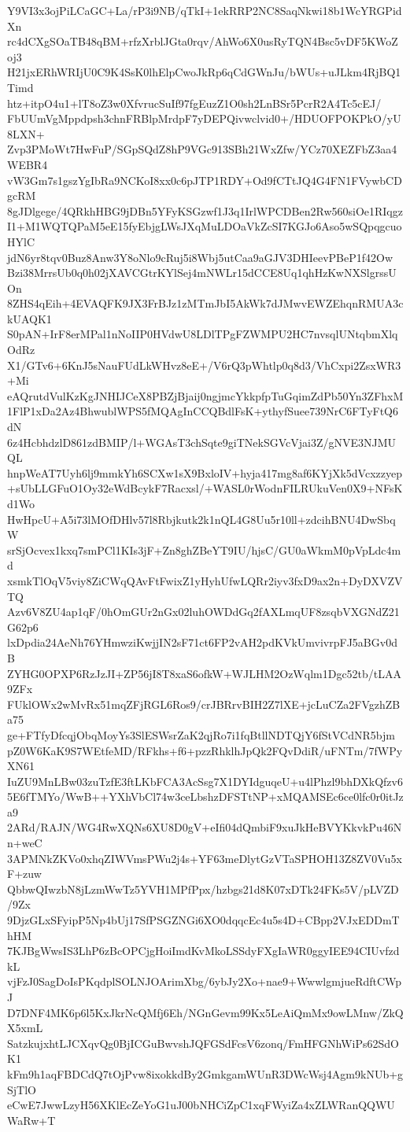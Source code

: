Y9VI3x3ojPiLCaGC+La/rP3i9NB/qTkI+1ekRRP2NC8SaqNkwi18b1WcYRGPidXn
rc4dCXgSOaTB48qBM+rfzXrblJGta0rqv/AhWo6X0usRyTQN4Bsc5vDF5KWoZoj3
H21jxERhWRIjU0C9K4SsK0lhElpCwoJkRp6qCdGWnJu/bWUs+uJLkm4RjBQ1Timd
htz+itpO4u1+lT8oZ3w0XfvrucSuIf97fgEuzZ1O0sh2LnBSr5PcrR2A4Tc5cEJ/
FbUUmVgMppdpsh3chnFRBlpMrdpF7yDEPQivwclvid0+/HDUOFPOKPkO/yU8LXN+
Zvp3PMoWt7HwFuP/SGpSQdZ8hP9VGc913SBh21WxZfw/YCz70XEZFbZ3aa4WEBR4
vW3Gm7s1gszYgIbRa9NCKoI8xx0c6pJTP1RDY+Od9fCTtJQ4G4FN1FVywbCDgcRM
8gJDlgege/4QRkhHBG9jDBn5YFyKSGzwf1J3q1IrlWPCDBen2Rw560siOe1RIqgz
I1+M1WQTQPaM5eE15fyEbjgLWsJXqMuLDOaVkZcSI7KGJo6Aso5wSQpqgcuoHYlC
jdN6yr8tqv0Buz8Anw3Y8oNlo9cRuj5i8Wbj5utCaa9aGJV3DHIeevPBeP1f42Ow
Bzi38MrrsUb0q0h02jXAVCGtrKYlSej4mNWLr15dCCE8Uq1qhHzKwNXSlgrssUOn
8ZHS4qEih+4EVAQFK9JX3FrBJz1zMTmJbI5AkWk7dJMwvEWZEhqnRMUA3ckUAQK1
S0pAN+IrF8erMPal1nNoIIP0HVdwU8LDlTPgFZWMPU2HC7nvsqlUNtqbmXlqOdRz
X1/GTv6+6KnJ5sNauFUdLkWHvz8eE+/V6rQ3pWhtlp0q8d3/VhCxpi2ZsxWR3+Mi
eAQrutdVulKzKgJNHIJCeX8PBZjBjaij0ngjmcYkkpfpTuGqimZdPb50Yn3ZFhxM
1FlP1xDa2Az4BhwublWPS5fMQAgInCCQBdlFsK+ythyfSuee739NrC6FTyFtQ6dN
6z4HcbhdzlD861zdBMIP/l+WGAsT3chSqte9giTNekSGVcVjai3Z/gNVE3NJMUQL
hnpWeAT7Uyh6lj9mmkYh6SCXw1sX9BxloIV+hyja417mg8af6KYjXk5dVcxzzyep
+sUbLLGFuO1Oy32eWdBcykF7Racxsl/+WASL0rWodnFILRUkuVen0X9+NFsKd1Wo
HwHpcU+A5i73lMOfDHlv57l8Rbjkutk2k1nQL4G8Uu5r10ll+zdcihBNU4DwSbqW
srSjOcvex1kxq7smPCl1KIs3jF+Zn8ghZBeYT9IU/hjsC/GU0aWkmM0pVpLdc4md
xsmkTlOqV5viy8ZiCWqQAvFtFwixZ1yHyhUfwLQRr2iyv3fxD9ax2n+DyDXVZVTQ
Azv6V8ZU4ap1qF/0hOmGUr2nGx02luhOWDdGq2fAXLmqUF8zsqbVXGNdZ21G62p6
lxDpdia24AeNh76YHmwziKwjjIN2sF71ct6FP2vAH2pdKVkUmvivrpFJ5aBGv0dB
ZYHG0OPXP6RzJzJI+ZP56jI8T8xaS6ofkW+WJLHM2OzWqlm1Dgc52tb/tLAA9ZFx
FUklOWx2wMvRx51mqZFjRGL6Ros9/crJBRrvBIH2Z7lXE+jcLuCZa2FVgzhZBa75
ge+FTfyDfcqjObqMoyYs3SlESWsrZaK2qjRo7i1fqBtllNDTQjY6fStVCdNR5bjm
pZ0W6KaK9S7WEtfeMD/RFkhs+f6+pzzRhklhJpQk2FQvDdiR/uFNTm/7fWPyXN61
IuZU9MnLBw03zuTzfE3ftLKbFCA3AcSsg7X1DYIdguqeU+u4lPhzl9bhDXkQfzv6
5E6fTMYo/WwB++YXhVbCl74w3ceLbshzDFSTtNP+xMQAMSEc6ce0lfc0r0itJza9
2ARd/RAJN/WG4RwXQNs6XU8D0gV+eIfi04dQmbiF9xuJkHeBVYKkvkPu46Nn+weC
3APMNkZKVo0xhqZIWVmsPWu2j4s+YF63meDlytGzVTaSPHOH13Z8ZV0Vu5xF+zuw
QbbwQIwzbN8jLzmWwTz5YVH1MPfPpx/hzbgs21d8K07xDTk24FKs5V/pLVZD/9Zx
9DjzGLxSFyipP5Np4bUj17SfPSGZNGi6XO0dqqcEc4u5s4D+CBpp2VJxEDDmThHM
7KJBgWwsIS3LhP6zBcOPCjgHoiImdKvMkoLSSdyFXgIaWR0ggyIEE94CIUvfzdkL
vjFzJ0SagDoIsPKqdplSOLNJOArimXbg/6ybJy2Xo+nae9+WwwlgmjueRdftCWpJ
D7DNF4MK6p6l5KxJkrNcQMfj6Eh/NGnGevm99Kx5LeAiQmMx9owLMnw/ZkQX5xmL
SatzkujxhtLJCXqvQg0BjICGuBwvshJQFGSdFcsV6zonq/FmHFGNhWiPs62SdOK1
kFm9h1aqFBDCdQ7tOjPvw8ixokkdBy2GmkgamWUnR3DWcWsj4Agm9kNUb+gSjTlO
eCwE7JwwLzyH56XKlEcZeYoG1uJ00bNHCiZpC1xqFWyiZa4xZLWRanQQWUWaRw+T
